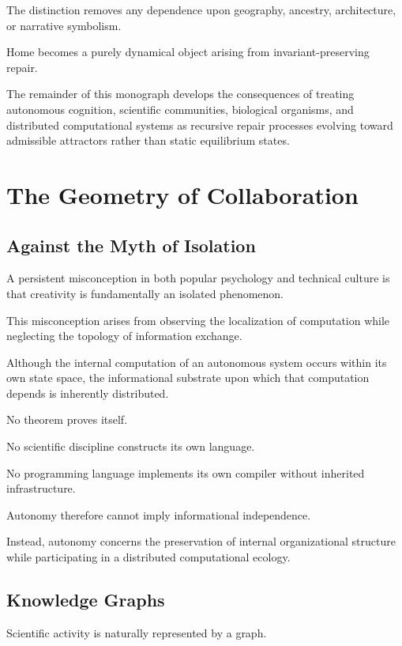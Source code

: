 \documentclass[11pt,oneside]{book}
\numberwithin{equation}{chapter}
\theoremstyle{definition}
\theoremstyle{plain}
\begin{document}
The distinction removes any dependence upon geography, ancestry, architecture,
or narrative symbolism.

Home becomes a purely dynamical object arising from invariant-preserving
repair.

The remainder of this monograph develops the consequences of treating
autonomous cognition, scientific communities, biological organisms, and
distributed computational systems as recursive repair processes evolving
toward admissible attractors rather than static equilibrium states.

\chapter{The Geometry of Collaboration}

\section{Against the Myth of Isolation}

A persistent misconception in both popular psychology and technical culture is
that creativity is fundamentally an isolated phenomenon.

This misconception arises from observing the localization of computation while
neglecting the topology of information exchange.

Although the internal computation of an autonomous system occurs within its
own state space, the informational substrate upon which that computation
depends is inherently distributed.

No theorem proves itself.

No scientific discipline constructs its own language.

No programming language implements its own compiler without inherited
infrastructure.

Autonomy therefore cannot imply informational independence.

Instead, autonomy concerns the preservation of internal organizational
structure while participating in a distributed computational ecology.

\section{Knowledge Graphs}

Scientific activity is naturally represented by a graph.
\end{document}
